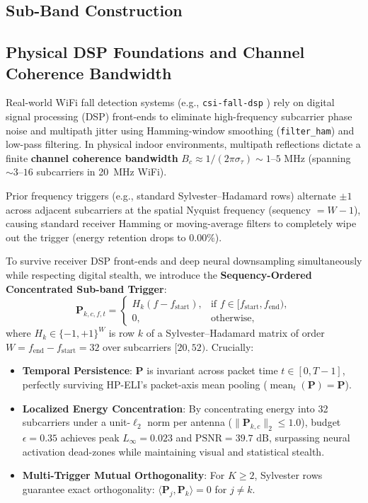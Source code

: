 \documentclass{article}
\begin{document}
\subsection{Sub-Band Construction}

\subsection{Physical DSP Foundations and Channel Coherence Bandwidth}

Real-world WiFi fall detection systems (e.g., \texttt{csi-fall-dsp} \cite{hassan2023csifall}) rely on digital signal processing (DSP) front-ends to eliminate high-frequency subcarrier phase noise and multipath jitter using Hamming-window smoothing (\texttt{filter\_ham}) and low-pass filtering. In physical indoor environments, multipath reflections dictate a finite \textbf{channel coherence bandwidth} $B_c \approx 1/(2\pi \sigma_\tau) \sim 1$--$5\text{~MHz}$ (spanning $\sim 3$--$16$ subcarriers in 20~MHz WiFi).

Prior frequency triggers (e.g., standard Sylvester--Hadamard rows) alternate $\pm 1$ across adjacent subcarriers at the spatial Nyquist frequency (sequency $= W-1$), causing standard receiver Hamming or moving-average filters to completely wipe out the trigger (energy retention drops to $0.00\%$).

To survive receiver DSP front-ends and deep neural downsampling simultaneously while respecting digital stealth, we introduce the \textbf{Sequency-Ordered Concentrated Sub-band Trigger}:
\begin{equation}
  \mathbf{P}_{k, c, f, t} =
  \begin{cases}
    H_{k}(f - f_{\text{start}}), & \text{if } f \in [f_{\text{start}}, f_{\text{end}}), \\
    0, & \text{otherwise},
  \end{cases}
\end{equation}
where $H_k \in \{-1, +1\}^W$ is row $k$ of a Sylvester--Hadamard matrix of order
$W = f_{\text{end}} - f_{\text{start}} = 32$ over subcarriers $[20, 52)$.  Crucially:
\begin{itemize}
    \item \textbf{Temporal Persistence}: $\mathbf{P}$ is invariant across packet time
          $t \in [0, T-1]$, perfectly surviving HP-ELI's packet-axis mean pooling
          ($\operatorname{mean}_t(\mathbf{P}) = \mathbf{P}$).
    \item \textbf{Localized Energy Concentration}: By concentrating energy into 32 subcarriers
          under a unit-$\ell_2$ norm per antenna ($\|\mathbf{P}_{k,c}\|_2 \le 1.0$), budget
          $\epsilon = 0.35$ achieves peak $L_\infty = 0.023$ and $\text{PSNR} = 39.7\text{~dB}$,
          surpassing neural activation dead-zones while maintaining visual and statistical stealth.
    \item \textbf{Multi-Trigger Mutual Orthogonality}: For $K \ge 2$, Sylvester rows guarantee
          exact orthogonality: $\langle \mathbf{P}_j, \mathbf{P}_k \rangle = 0$ for $j \neq k$.
\end{itemize}
\end{document}
